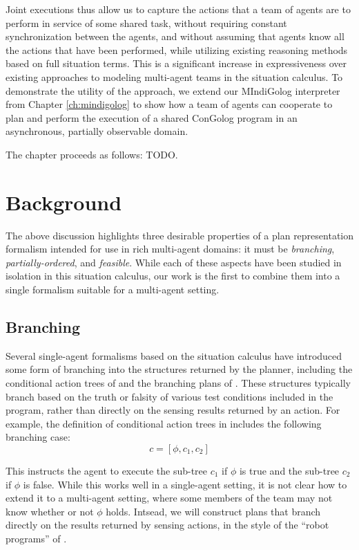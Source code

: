 Joint executions thus allow us to capture the actions that a team
of agents are to perform in service of some shared task, without requiring
constant synchronization between the agents, and without assuming
that agents know all the actions that have been performed, while utilizing
existing reasoning methods based on full situation terms. This is
a significant increase in expressiveness over existing approaches
to modeling multi-agent teams in the situation calculus. To demonstrate
the utility of the approach, we extend our MIndiGolog interpreter
from Chapter \ref{ch:mindigolog} to show how a team of agents can
cooperate to plan and perform the execution of a shared ConGolog program
in an asynchronous, partially observable domain.

The chapter proceeds as follows: TODO.


\section{Background\label{sec:JointExec:Background}}

The above discussion highlights three desirable properties of a plan
representation formalism intended for use in rich multi-agent domains:
it must be \emph{branching}, \emph{partially-ordered}, and \emph{feasible}.
While each of these aspects have been studied in isolation in this
situation calculus, our work is the first to combine them into a single
formalism suitable for a multi-agent setting.


\subsection{Branching}

Several single-agent formalisms based on the situation calculus have
introduced some form of branching into the structures returned by
the planner, including the conditional action trees of \citep{lakemeyer99golog_cats}
and the branching plans of \citep{giacomo04sem_delib_indigolog}.
These structures typically branch based on the truth or falsity of
various test conditions included in the program, rather than directly
on the sensing results returned by an action. For example, the definition
of conditional action trees in \citep{lakemeyer99golog_cats} includes
the following branching case:\[
c=[\phi,c_{1},c_{2}]\]


This instructs the agent to execute the sub-tree $c_{1}$ if $\phi$
is true and the sub-tree $c_{2}$ if $\phi$ is false. While this
works well in a single-agent setting, it is not clear how to extend
it to a multi-agent setting, where some members of the team may not
know whether or not $\phi$ holds. Intsead, we will construct plans
that branch directly on the results returned by sensing actions, in
the style of the {}``robot programs'' of \citep{levesque96what_is_planning}.


